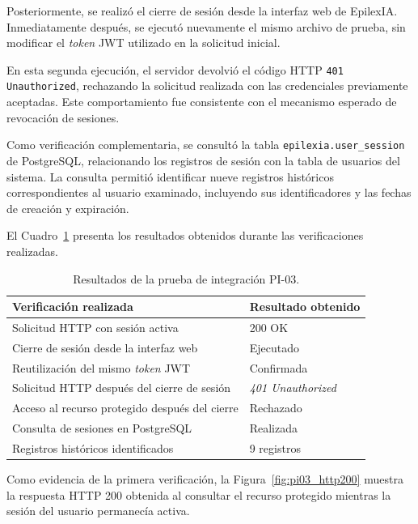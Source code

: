 Posteriormente, se realizó el cierre de sesión desde la interfaz web de EpilexIA. Inmediatamente después, se ejecutó nuevamente el mismo archivo de prueba, sin modificar el \textit{token} JWT utilizado en la solicitud inicial.

En esta segunda ejecución, el servidor devolvió el código HTTP \texttt{401 Unauthorized}, rechazando la solicitud realizada con las credenciales previamente aceptadas. Este comportamiento fue consistente con el mecanismo esperado de revocación de sesiones.

Como verificación complementaria, se consultó la tabla \texttt{epilexia.user\_session} de PostgreSQL, relacionando los registros de sesión con la tabla de usuarios del sistema. La consulta permitió identificar nueve registros históricos correspondientes al usuario examinado, incluyendo sus identificadores y las fechas de creación y expiración.

El Cuadro~\ref{tab:pi03_resultados} presenta los resultados obtenidos durante las verificaciones realizadas.

\begin{table}[htbp]
    \centering
    \caption{Resultados de la prueba de integración PI-03.}
    \label{tab:pi03_resultados}
    \small
    \begin{tabular}{|p{}|p{}|}
        \hline
        \textbf{Verificación realizada} & \textbf{Resultado obtenido} \\
        \hline
        Solicitud HTTP con sesión activa & 200 OK \\
        \hline
        Cierre de sesión desde la interfaz web & Ejecutado \\
        \hline
        Reutilización del mismo \textit{token} JWT & Confirmada \\
        \hline
        Solicitud HTTP después del cierre de sesión & \textit{401 Unauthorized} \\
        \hline
        Acceso al recurso protegido después del cierre & Rechazado \\
        \hline
        Consulta de sesiones en PostgreSQL & Realizada \\
        \hline
        Registros históricos identificados & 9 registros \\
        \hline
    \end{tabular}
\end{table}

Como evidencia de la primera verificación, la Figura~\ref{fig:pi03_http200} muestra la respuesta HTTP 200 obtenida al consultar el recurso protegido mientras la sesión del usuario permanecía activa.

